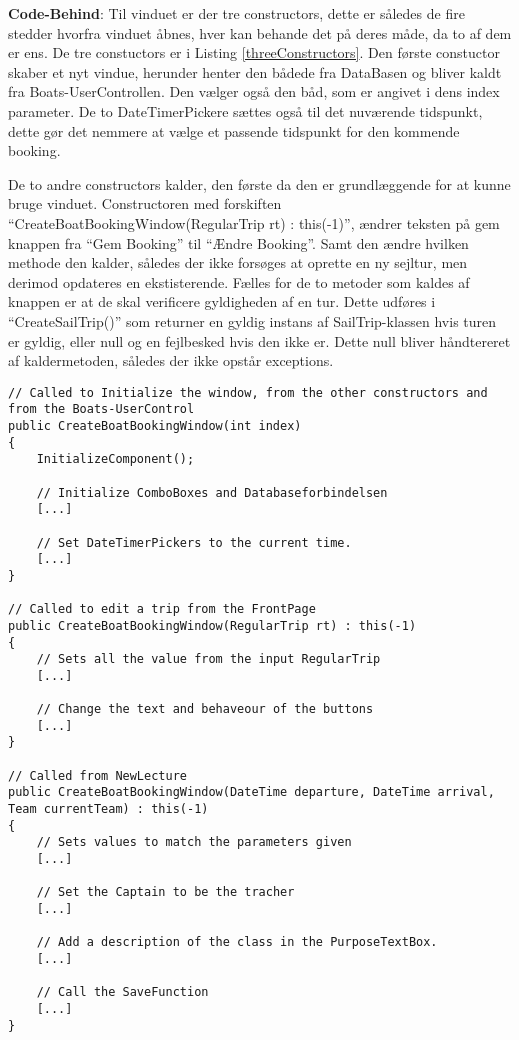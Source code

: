 \textbf{Code-Behind}: 
Til vinduet er der tre constructors, dette er således de fire stedder hvorfra vinduet åbnes, hver kan behande det på deres måde, da to af dem er ens. 
De tre constuctors er i Listing \ref{threeConstructors}.
Den første constuctor skaber et nyt vindue, herunder henter den bådede fra DataBasen og bliver kaldt fra Boats-UserControllen.
Den vælger også den båd, som er angivet i dens index parameter.
De to DateTimerPickere sættes også til det nuværende tidspunkt, dette gør det nemmere at vælge et passende tidspunkt for den kommende booking.

De to andre constructors kalder, den første da den er grundlæggende for at kunne bruge vinduet. 
Constructoren med forskiften ``CreateBoatBookingWindow(RegularTrip rt) : this(-1)'', ændrer teksten på gem knappen fra ``Gem Booking'' til ``Ændre Booking''. 
Samt den ændre hvilken methode den kalder, således der ikke forsøges at oprette en ny sejltur, men derimod opdateres en ekstisterende. 
Fælles for de to metoder som kaldes af knappen er at de skal verificere gyldigheden af en tur. 
Dette udføres i ``CreateSailTrip()'' som returner en gyldig instans af SailTrip-klassen hvis turen er gyldig, eller null og en fejlbesked hvis den ikke er. 
Dette null bliver håndtereret af kaldermetoden, således der ikke opstår exceptions.

\begin{lstlisting}[frame=single, caption=De tre constuctoreres forskrifter, label=threeConstructors]
// Called to Initialize the window, from the other constructors and from the Boats-UserControl
public CreateBoatBookingWindow(int index)
{
    InitializeComponent();

    // Initialize ComboBoxes and Databaseforbindelsen
    [...]

    // Set DateTimerPickers to the current time.
    [...]
}

// Called to edit a trip from the FrontPage
public CreateBoatBookingWindow(RegularTrip rt) : this(-1)
{
    // Sets all the value from the input RegularTrip
    [...]

    // Change the text and behaveour of the buttons
    [...]
}

// Called from NewLecture
public CreateBoatBookingWindow(DateTime departure, DateTime arrival, Team currentTeam) : this(-1)
{
    // Sets values to match the parameters given
    [...]

    // Set the Captain to be the tracher
    [...]

    // Add a description of the class in the PurposeTextBox.
    [...]

    // Call the SaveFunction
    [...]
}
\end{lstlisting}

